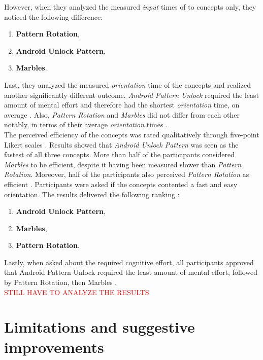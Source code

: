 However, when they analyzed the measured \textit{input} times of to concepts only, they noticed the following difference:

\begin{enumerate}
    \item \textbf{Pattern Rotation},
    \item \textbf{Android Unlock Pattern},
    \item \textbf{Marbles}.
\end{enumerate}

Last, they analyzed the measured \textit{orientation} time of the concepts and realized another significantly different outcome. \textit{Android Pattern Unlock} required the least amount of mental effort and therefore had the shortest \textit{orientation} time, on average \cite{anonymous}. Also, \textit{Pattern Rotation} and \textit{Marbles} did not differ from each other notably, in terms of their average \textit{orientation} times \cite{anonymous}. \\
The perceived efficiency of the concepts was rated qualitatively through five-point Likert scales \cite{anonymous}. Results showed that \textit{Android Unlock Pattern} was seen as the fastest of all three concepts. More than half of the participants considered \textit{Marbles} to be efficient, despite it having been measured slower than \textit{Pattern Rotation}. Moreover, half of the participants also perceived \textit{Pattern Rotation} as efficient \cite{anonymous}. Participants were asked if the concepts contented a fast and easy orientation. The results delivered the following ranking \cite{anonymous}: 

\begin{enumerate}
     \item \textbf{Android Unlock Pattern},
    \item \textbf{Marbles},
    \item \textbf{Pattern Rotation}.
\end{enumerate}

Lastly, when asked about the required cognitive effort, all participants approved that Android Pattern Unlock required the least amount of mental effort, followed by Pattern Rotation, then Marbles \cite{anonymous}. \\

\textcolor{red}{STILL HAVE TO ANALYZE THE RESULTS}

\section{Limitations and suggestive improvements}

